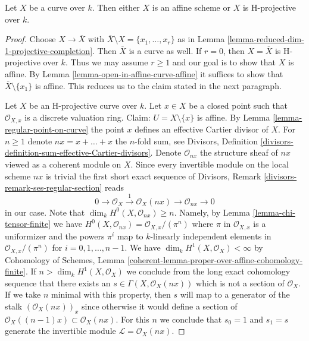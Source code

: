 \begin{lemma}
\label{lemma-curve-affine-projective}
Let $X$ be a curve over $k$. Then either $X$ is an affine scheme or $X$
is H-projective over $k$.
\end{lemma}

\begin{proof}
Choose $X \to \overline{X}$ with
$\overline{X} \setminus X = \{x_1, \ldots, x_r\}$ as in
Lemma \ref{lemma-reduced-dim-1-projective-completion}.
Then $\overline{X}$ is a curve as well.
If $r = 0$, then $X = \overline{X}$ is H-projective over $k$.
Thus we may assume $r \geq 1$ and our goal is to show that
$X$ is affine. By Lemma \ref{lemma-open-in-affine-curve-affine}
it suffices to show that $\overline{X} \setminus \{x_1\}$ is affine.
This reduces us to the claim stated in the next paragraph.

\medskip\noindent
Let $X$ be an H-projective curve over $k$. Let $x \in X$ be a closed point
such that $\mathcal{O}_{X, x}$ is a discrete valuation ring. Claim:
$U = X \setminus \{x\}$ is affine. By Lemma \ref{lemma-regular-point-on-curve}
the point $x$ defines an effective Cartier divisor of $X$.
For $n \geq 1$ denote $nx = x + \ldots + x$ the $n$-fold sum, see
Divisors, Definition \ref{divisors-definition-sum-effective-Cartier-divisors}.
Denote $\mathcal{O}_{nx}$ the structure sheaf of $nx$ viewed as a
coherent module on $X$.
Since every invertible module on the local scheme $nx$ is trivial
the first short exact sequence of
Divisors, Remark \ref{divisors-remark-ses-regular-section}
reads
$$
0 \to \mathcal{O}_X
\xrightarrow{1} \mathcal{O}_X(nx) \to \mathcal{O}_{nx} \to 0
$$
in our case. Note that $\dim_k H^0(X, \mathcal{O}_{nx}) \geq n$.
Namely, by Lemma \ref{lemma-chi-tensor-finite} we have
$H^0(X, \mathcal{O}_{nx}) = \mathcal{O}_{X, x}/(\pi^n)$ where $\pi$ in
$\mathcal{O}_{X, x}$ is a uniformizer and the powers $\pi^i$ map to
$k$-linearly independent elements in $\mathcal{O}_{X, x}/(\pi^n)$
for $i = 0, 1, \ldots, n - 1$. We have $\dim_k H^1(X, \mathcal{O}_X) < \infty$
by Cohomology of Schemes, Lemma
\ref{coherent-lemma-proper-over-affine-cohomology-finite}.
If $n > \dim_k H^1(X, \mathcal{O}_X)$
we conclude from the long exact cohomology sequence
that there exists an $s \in \Gamma(X, \mathcal{O}_X(nx))$
which is not a section of $\mathcal{O}_X$.
If we take $n$ minimal with this property, then $s$ will
map to a generator of the stalk
$\left(\mathcal{O}_X(nx)\right)_x$ since otherwise it would
define a section of $\mathcal{O}_X((n - 1)x) \subset \mathcal{O}_X(nx)$.
For this $n$ we conclude that $s_0 = 1$ and $s_1 = s$
generate the invertible module $\mathcal{L} = \mathcal{O}_X(nx)$.


\end{proof}
